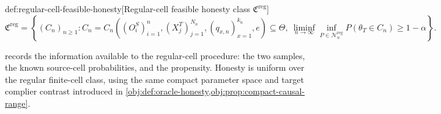 \documentclass[11pt]{article}
\begin{document}
\begin{definitionv}{def:regular-cell-feasible-honesty}[Regular-cell feasible honesty class \(\mathfrak C^{\mathrm{reg}}\)]
\[
\mathfrak C^{\mathrm{reg}}
=
\left\{
(C_n)_{n\ge 1}:
C_n
=
C_n\left(
(O_i^S)_{i=1}^n,
(X_j^T)_{j=1}^{N_n},
(q_{x,n})_{x=1}^{k_n},e
\right)
\subseteq \Theta,\ 
\liminf_{n\to\infty}\inf_{P\in\mathcal N_n^{\mathrm{reg}}}
P(\theta_T\in C_n)\ge 1-\alpha
\right\}.
\]
\end{definitionv}

 records the information available to the regular-cell procedure: the two samples, the known source-cell probabilities, and the propensity. Honesty is uniform over the regular finite-cell class, using the same compact parameter space and target complier contrast introduced in \cref{obj:def:oracle-honesty,obj:prop:compact-causal-range}.
\end{document}

